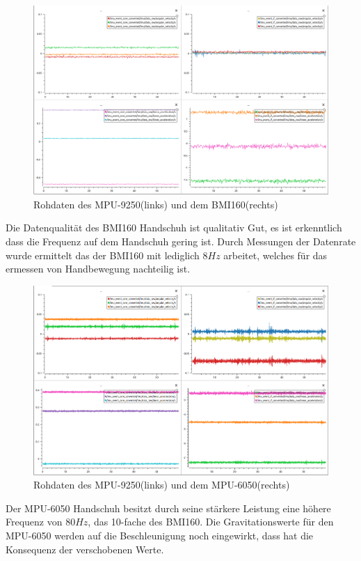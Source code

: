 \begin{figure}[h]
	\centering
    \includegraphics[width=1\columnwidth]{Bachelorarbeit/images/160-9250-RawData.png}
    \caption{Rohdaten des MPU-9250(links) und dem BMI160(rechts)}
    \label{fig:RawData160}
\end{figure}
Die Datenqualität des BMI160 Handschuh ist qualitativ Gut, es ist erkenntlich dass die Frequenz auf dem Handschuh gering ist. Durch Messungen der Datenrate wurde ermittelt das der BMI160 mit lediglich $8 Hz$ arbeitet, welches für das ermessen von Handbewegung nachteilig ist. 
\newpage
\begin{figure}[h]
	\centering
    \includegraphics[width=1\columnwidth]{Bachelorarbeit/images/6050-9250RawData.png}
    \caption{Rohdaten des MPU-9250(links) und dem MPU-6050(rechts)}
    \label{fig:RawData6050}
\end{figure}
Der MPU-6050 Handschuh besitzt durch seine stärkere Leistung eine höhere Frequenz von $80 Hz$, das 10-fache des BMI160. Die Gravitationswerte für den MPU-6050 werden auf die Beschleunigung noch eingewirkt, dass hat die Konsequenz der verschobenen Werte.

